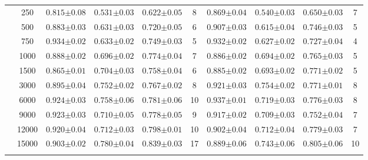 \begin{table}[H]
\begin{tabularx}{\textwidth}{cc | YYYc | YYYc }
        & 250 & $0.815{\scriptscriptstyle\pm0.08}$ & $0.531{\scriptscriptstyle\pm0.03}$ & $0.622{\scriptscriptstyle\pm0.05}$ & 8 & $0.869{\scriptscriptstyle\pm0.04}$ & $0.540{\scriptscriptstyle\pm0.03}$ & $0.650{\scriptscriptstyle\pm0.03}$ & 7\\
        & 500 & $0.883{\scriptscriptstyle\pm0.03}$ & $0.631{\scriptscriptstyle\pm0.03}$ & $0.720{\scriptscriptstyle\pm0.05}$ & 6 & $0.907{\scriptscriptstyle\pm0.03}$ & $0.615{\scriptscriptstyle\pm0.04}$ & $0.746{\scriptscriptstyle\pm0.03}$ & 5\\
        & 750 & $0.934{\scriptscriptstyle\pm0.02}$ & $0.633{\scriptscriptstyle\pm0.02}$ & $0.749{\scriptscriptstyle\pm0.03}$ & 5 & $0.932{\scriptscriptstyle\pm0.02}$ & $0.627{\scriptscriptstyle\pm0.02}$ & $0.727{\scriptscriptstyle\pm0.04}$ & 4\\
        & 1000 & $0.888{\scriptscriptstyle\pm0.02}$ & $0.696{\scriptscriptstyle\pm0.02}$ & $0.774{\scriptscriptstyle\pm0.04}$ & 7 & $0.886{\scriptscriptstyle\pm0.02}$ & $0.694{\scriptscriptstyle\pm0.02}$ & $0.765{\scriptscriptstyle\pm0.03}$ & 5\\
        & 1500 & $0.865{\scriptscriptstyle\pm0.01}$ & $0.704{\scriptscriptstyle\pm0.03}$ & $0.758{\scriptscriptstyle\pm0.04}$ & 6 & $0.885{\scriptscriptstyle\pm0.02}$ & $0.693{\scriptscriptstyle\pm0.02}$ & $0.771{\scriptscriptstyle\pm0.02}$ & 5\\
        & 3000 & $0.895{\scriptscriptstyle\pm0.04}$ & $0.752{\scriptscriptstyle\pm0.02}$ & $0.767{\scriptscriptstyle\pm0.02}$ & 8 & $0.921{\scriptscriptstyle\pm0.03}$ & $0.754{\scriptscriptstyle\pm0.02}$ & $0.771{\scriptscriptstyle\pm0.01}$ & 8\\
        & 6000 & $0.924{\scriptscriptstyle\pm0.03}$ & $0.758{\scriptscriptstyle\pm0.06}$ & $0.781{\scriptscriptstyle\pm0.06}$ & 10 & $0.937{\scriptscriptstyle\pm0.01}$ & $0.719{\scriptscriptstyle\pm0.03}$ & $0.776{\scriptscriptstyle\pm0.03}$ & 8\\
        & 9000 & $0.923{\scriptscriptstyle\pm0.03}$ & $0.710{\scriptscriptstyle\pm0.05}$ & $0.778{\scriptscriptstyle\pm0.05}$ & 9 & $0.917{\scriptscriptstyle\pm0.02}$ & $0.709{\scriptscriptstyle\pm0.03}$ & $0.752{\scriptscriptstyle\pm0.04}$ & 7\\
        & 12000 & $0.920{\scriptscriptstyle\pm0.04}$ & $0.712{\scriptscriptstyle\pm0.03}$ & $0.798{\scriptscriptstyle\pm0.01}$ & 10 & $0.902{\scriptscriptstyle\pm0.04}$ & $0.712{\scriptscriptstyle\pm0.04}$ & $0.779{\scriptscriptstyle\pm0.03}$ & 7\\
        & 15000 & $0.903{\scriptscriptstyle\pm0.02}$ & $0.780{\scriptscriptstyle\pm0.04}$ & $0.839{\scriptscriptstyle\pm0.03}$ & 17 & $0.889{\scriptscriptstyle\pm0.06}$ & $0.743{\scriptscriptstyle\pm0.06}$ & $0.805{\scriptscriptstyle\pm0.06}$ & 10\\
         \\
    \end{tabularx}
\end{table}

